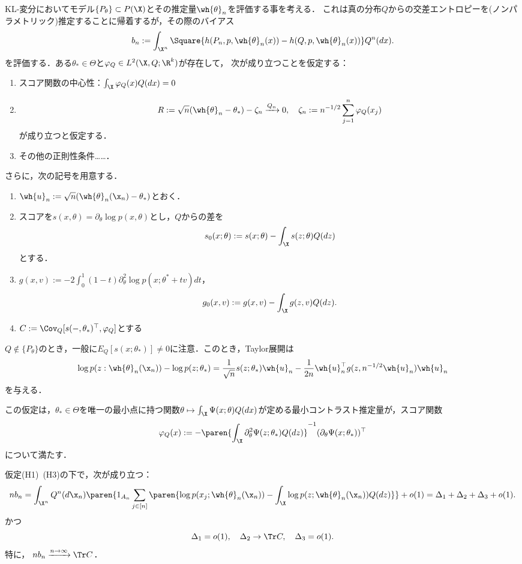 \documentclass[uplatex,dvipdfmx]{jsreport}
\begin{document}
\begin{model}[KL-変分によるパラメトリックモデルの評価]
    KL-変分においてモデル$\{P_\theta\}\subset P(\X)$とその推定量$\wh{\theta}_n$を評価する事を考える．
    これは真の分布$Q$からの交差エントロピーを(ノンパラメトリック)推定することに帰着するが，その際のバイアス
    \[b_n:=\int_{\X^n}\Square{h(P_n,p,\wh{\theta}_n(x))-h(Q,p,\wh{\theta}_n(x))}Q^n(dx).\]
    を評価する．ある$\theta_*\in\Theta$と$\varphi_Q\in L^2(\X,Q;\R^k)$が存在して，
    次が成り立つことを仮定する：
    \begin{enumerate}[({H}1)]
        \item スコア関数の中心性：$\int_\X\varphi_Q(x)Q(dx)=0$
        \item \[R:=\sqrt{n}(\wh{\theta}_n-\theta_*)-\zeta_n\xrightarrow{Q_n}0,\quad\zeta_n:=n^{-1/2}\sum_{j=1}^n\varphi_Q(x_j)\]
        が成り立つと仮定する．
        \item その他の正則性条件……．
    \end{enumerate}
    さらに，次の記号を用意する．
    \begin{enumerate}
        \item $\wh{u}_n:=\sqrt{n}(\wh{\theta}_n(\x_n)-\theta_*)$とおく．
        \item スコアを$s(x,\theta)=\partial_\theta\log p(x,\theta)$とし，$Q$からの差を
        \[s_0(x;\theta):=s(x;\theta)-\int_\X s(z;\theta)Q(dz)\]
        とする．
        \item $g(x,v):=-2\int^1_0(1-t)\partial^2_\theta\log p(x;\theta^*+tv)dt$，
        \[g_0(x,v):=g(x,v)-\int_\X g(z,v)Q(dz).\]
        \item $C:=\Cov_Q[s(-,\theta_*)^\top,\varphi_Q]$とする
    \end{enumerate}
    $Q\notin\{P_\theta\}$のとき，一般に$E_Q[s(x;\theta_*)]\ne0$に注意．このとき，Taylor展開は
    \[\log p(z:\wh{\theta}_n(\x_n))-\log p(z;\theta_*)=\frac{1}{\sqrt{n}}s(z;\theta_*)\wh{u}_n-\frac{1}{2n}\wh{u}_n^\top g(z,n^{-1/2}\wh{u}_n)\wh{u}_n\]
    を与える．
\end{model}
\begin{remarks}
    この仮定は，$\theta_*\in\Theta$を唯一の最小点に持つ関数$\theta\mapsto\int_\X\Psi(x;\theta)Q(dx)$が定める最小コントラスト推定量が，スコア関数
    \[\varphi_Q(x):=-\paren{\int_\X\partial_\theta^2\Psi(z;\theta_*)Q(dz)}^{-1}(\partial_\theta\Psi(x;\theta_*))^\top\]
    について満たす．
\end{remarks}

\begin{theorem}[バイアスの漸近分布]
    仮定(H1)~(H3)の下で，次が成り立つ：
    \[nb_n=\int_{\X^n}Q^n(d\x_n)\paren{1_{A_n}\sum_{j\in[n]}\paren{\log p(x_j;\wh{\theta}_n(\x_n))-\int_\X\log p(z;\wh{\theta}_n(\x_n))Q(dz)}}+o(1)=\Delta_1+\Delta_2+\Delta_3+o(1).\]
    かつ
    \[\Delta_1=o(1),\quad\Delta_2\to\Tr C,\quad\Delta_3=o(1).\]
    特に，
    $nb_n\xrightarrow{n\to\infty}\Tr C$．
\end{theorem}
\end{document}
